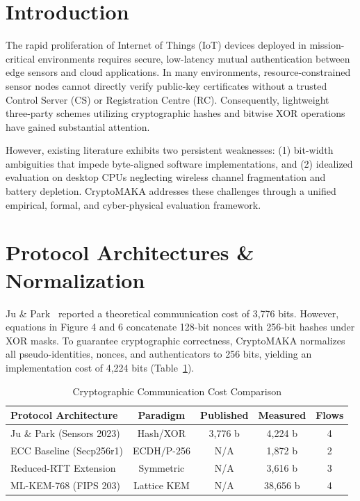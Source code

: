 \documentclass[journal,10pt,twocolumn]{IEEEtran}
\begin{document}
\section{Introduction}
The rapid proliferation of Internet of Things (IoT) devices deployed in mission-critical environments requires secure, low-latency mutual authentication between edge sensors and cloud applications. In many environments, resource-constrained sensor nodes cannot directly verify public-key certificates without a trusted Control Server (CS) or Registration Centre (RC). Consequently, lightweight three-party schemes utilizing cryptographic hashes and bitwise XOR operations have gained substantial attention.

However, existing literature exhibits two persistent weaknesses: (1) bit-width ambiguities that impede byte-aligned software implementations, and (2) idealized evaluation on desktop CPUs neglecting wireless channel fragmentation and battery depletion. CryptoMAKA addresses these challenges through a unified empirical, formal, and cyber-physical evaluation framework.

\section{Protocol Architectures \& Normalization}
Ju \& Park~\cite{jupark2023} reported a theoretical communication cost of 3,776 bits. However, equations in Figure 4 and 6 concatenate 128-bit nonces with 256-bit hashes under XOR masks. To guarantee cryptographic correctness, CryptoMAKA normalizes all pseudo-identities, nonces, and authenticators to 256 bits, yielding an implementation cost of 4,224 bits (Table~\ref{tab:comm}).

\begin{table}[htbp]
\caption{Cryptographic Communication Cost Comparison}
\begin{center}
\begin{tabular}{lcccc}
\toprule
\textbf{Protocol Architecture} & \textbf{Paradigm} & \textbf{Published} & \textbf{Measured} & \textbf{Flows} \\
\midrule
Ju \& Park (Sensors 2023) & Hash/XOR & 3,776 b & 4,224 b & 4 \\
ECC Baseline (Secp256r1) & ECDH/P-256 & N/A & 1,872 b & 2 \\
Reduced-RTT Extension & Symmetric & N/A & 3,616 b & 3 \\
ML-KEM-768 (FIPS 203) & Lattice KEM & N/A & 38,656 b & 4 \\
\bottomrule
\end{tabular}
\label{tab:comm}
\end{center}
\end{table}
\end{document}
